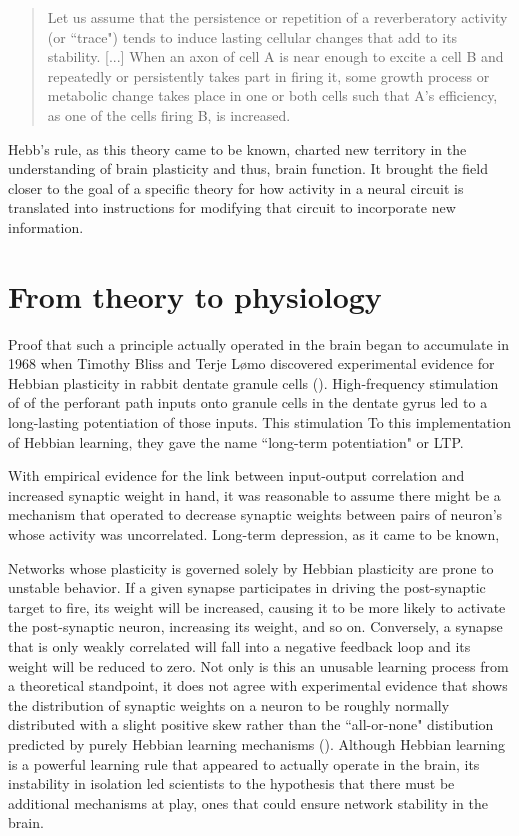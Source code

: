 \begin{quotation}
Let us assume that the persistence or repetition of a reverberatory activity (or ``trace") tends to induce lasting cellular changes that add to its stability. [...] When an axon of cell A is near enough to excite a cell B and repeatedly or persistently takes part in firing it, some growth process or metabolic change takes place in one or both cells such that A's efficiency, as one of the cells firing B, is increased.
\end{quotation}

Hebb's rule, as this theory came to be known, charted new territory in the understanding of brain plasticity and thus, brain function. It brought the field closer to the goal of a specific theory for how activity in a neural circuit is translated into instructions for modifying that circuit to incorporate new information.

\section{From theory to physiology}

Proof that such a principle actually operated in the brain began to accumulate in 1968 when Timothy Bliss and Terje L\o mo discovered experimental evidence for Hebbian plasticity in rabbit dentate granule cells (\cite{Bliss1973}). High-frequency stimulation of of the perforant path inputs onto granule cells in the dentate gyrus led to a long-lasting potentiation of those inputs. This stimulation To this implementation of Hebbian learning, they gave the name ``long-term potentiation" or LTP.

With empirical evidence for the link between input-output correlation and increased synaptic weight in hand, it was reasonable to assume there might be a mechanism that operated to decrease synaptic weights between pairs of neuron's whose activity was uncorrelated. Long-term depression, as it came to be known, 

Networks whose plasticity is governed solely by Hebbian plasticity are prone to unstable behavior. If a given synapse participates in driving the post-synaptic target to fire, its weight will be increased, causing it to be more likely to activate the post-synaptic neuron, increasing its weight, and so on. Conversely, a synapse that is only weakly correlated will fall into a negative feedback loop and its weight will be reduced to zero. Not only is this an unusable learning process from a theoretical standpoint, it does not agree with experimental evidence that shows the distribution of synaptic weights on a neuron to be roughly normally distributed with a slight positive skew rather than the ``all-or-none" distibution predicted by purely Hebbian learning mechanisms (\cite{Turrigiano1998}). Although Hebbian learning is a powerful learning rule that appeared to actually operate in the brain, its instability in isolation led scientists to the hypothesis that there must be additional mechanisms at play, ones that could ensure network stability in the brain.

